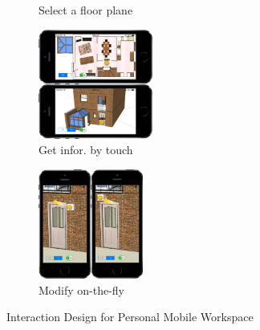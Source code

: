 \begin{figure}[b!]
\begin{subfigure}[b]{0.23\textwidth}
                \caption{Select a floor plane}
                \label{fig:selecting_floor}
        \end{subfigure}%
        \hfill
        \begin{subfigure}[b]{0.23\textwidth}
            \centering
                \includegraphics[width=\textwidth, height=3.6cm]{4-Interaction_Design/m_info}
                \caption{Get infor. by touch}
                \label{fig:m_info}
        \end{subfigure}%
        \hfill
        \begin{subfigure}[b]{0.23\textwidth}
            \centering
                \includegraphics[width=\textwidth, height=3.6cm]{4-Interaction_Design/m_move}
                \caption{Modify on-the-fly}
                \label{fig:m_move}
        \end{subfigure}%
    \caption{Interaction Design for Personal Mobile Workspace}
    \label{fig:pwm_interaction}
\end{figure}